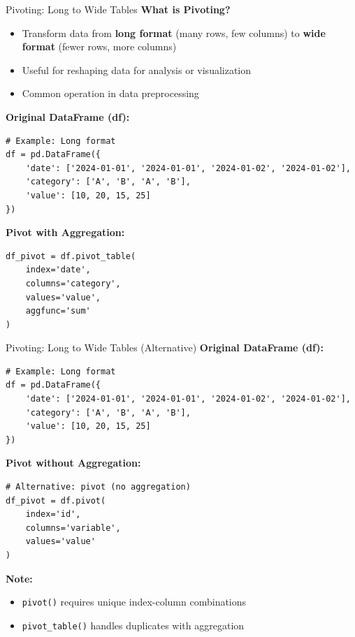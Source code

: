 \documentclass[aspectratio=169]{beamer}
\begin{document}
\begin{frame}[fragile]{Pivoting: Long to Wide Tables}
\footnotesize
\textbf{What is Pivoting?}
\begin{itemize}
    \item Transform data from \textbf{long format} (many rows, few columns) to \textbf{wide format} (fewer rows, more columns)
    \item Useful for reshaping data for analysis or visualization
    \item Common operation in data preprocessing
\end{itemize}

\vspace{0.1cm}
\textbf{Original DataFrame (df):}
\begin{lstlisting}[basicstyle=\tiny]
# Example: Long format
df = pd.DataFrame({
    'date': ['2024-01-01', '2024-01-01', '2024-01-02', '2024-01-02'],
    'category': ['A', 'B', 'A', 'B'],
    'value': [10, 20, 15, 25]
})
\end{lstlisting}

\vspace{0.1cm}
\textbf{Pivot with Aggregation:}
\begin{lstlisting}[basicstyle=\tiny]
df_pivot = df.pivot_table(
    index='date',
    columns='category',
    values='value',
    aggfunc='sum'
)
\end{lstlisting}
\end{frame}

\begin{frame}[fragile]{Pivoting: Long to Wide Tables (Alternative)}
\footnotesize
\textbf{Original DataFrame (df):}
\begin{lstlisting}[basicstyle=\tiny]
# Example: Long format
df = pd.DataFrame({
    'date': ['2024-01-01', '2024-01-01', '2024-01-02', '2024-01-02'],
    'category': ['A', 'B', 'A', 'B'],
    'value': [10, 20, 15, 25]
})
\end{lstlisting}

\vspace{0.1cm}
\textbf{Pivot without Aggregation:}
\begin{lstlisting}[basicstyle=\tiny]
# Alternative: pivot (no aggregation)
df_pivot = df.pivot(
    index='id',
    columns='variable',
    values='value'
)
\end{lstlisting}

\vspace{0.1cm}
\textbf{Note:}
\begin{itemize}
    \item \texttt{pivot()} requires unique index-column combinations
    \item \texttt{pivot\_table()} handles duplicates with aggregation
\end{itemize}
\end{frame}
\end{document}
